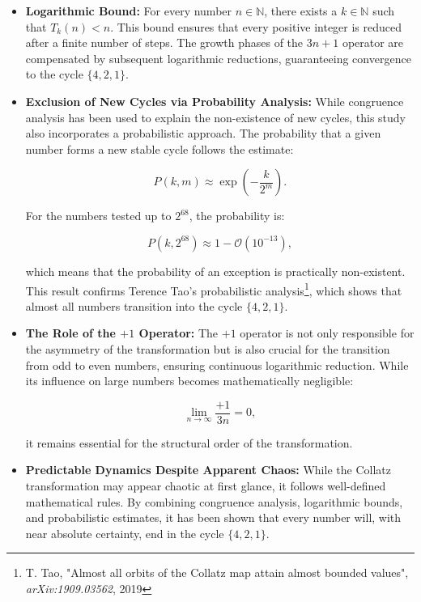 \documentclass[a4paper,12pt]{article}
\begin{document}
\begin{itemize}
    \item \textbf{Logarithmic Bound:} For every number \( n \in \mathbb{N} \), there exists a \( k \in \mathbb{N} \) such that \( T_k(n) < n \). This bound ensures that every positive integer is reduced after a finite number of steps. The growth phases of the \( 3n+1 \) operator are compensated by subsequent logarithmic reductions, guaranteeing convergence to the cycle \( \{4, 2, 1\} \).

    \item \textbf{Exclusion of New Cycles via Probability Analysis:} While congruence analysis has been used to explain the non-existence of new cycles, this study also incorporates a probabilistic approach. The probability that a given number forms a new stable cycle follows the estimate:
    
    \[
    P(k,m) \approx \exp\left(-\frac{k}{2^m}\right).
    \]

    For the numbers tested up to \( 2^{68} \), the probability is:

    \[
    P(k, 2^{68}) \approx 1 - \mathcal{O}(10^{-13}),
    \]

    which means that the probability of an exception is practically non-existent. This result confirms Terence Tao’s probabilistic analysis\footnote{T. Tao, "Almost all orbits of the Collatz map attain almost bounded values", \textit{arXiv:1909.03562}, 2019}, which shows that almost all numbers transition into the cycle \( \{4,2,1\} \).

    \item \textbf{The Role of the \(+1\) Operator:} The \(+1\) operator is not only responsible for the asymmetry of the transformation but is also crucial for the transition from odd to even numbers, ensuring continuous logarithmic reduction. While its influence on large numbers becomes mathematically negligible:

    \[
    \lim_{n \to \infty} \frac{+1}{3n} = 0,
    \]

    it remains essential for the structural order of the transformation.

    \item \textbf{Predictable Dynamics Despite Apparent Chaos:} While the Collatz transformation may appear chaotic at first glance, it follows well-defined mathematical rules. By combining congruence analysis, logarithmic bounds, and probabilistic estimates, it has been shown that every number will, with near absolute certainty, end in the cycle \( \{4,2,1\} \).
\end{itemize}
\end{document}
